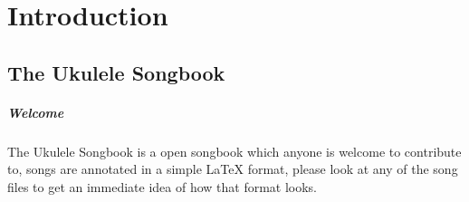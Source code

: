 \chapter{Introduction}\label{ch:introduction}
\section{The Ukulele Songbook} %
\label{sec:the_ukulele_songbook}

\paragraph{Welcome} %
\label{par:welcome}

The Ukulele Songbook is a open songbook which anyone is welcome to contribute to, songs are annotated in a simple LaTeX format, please look at any of the song files to get an immediate idea of how that format looks.